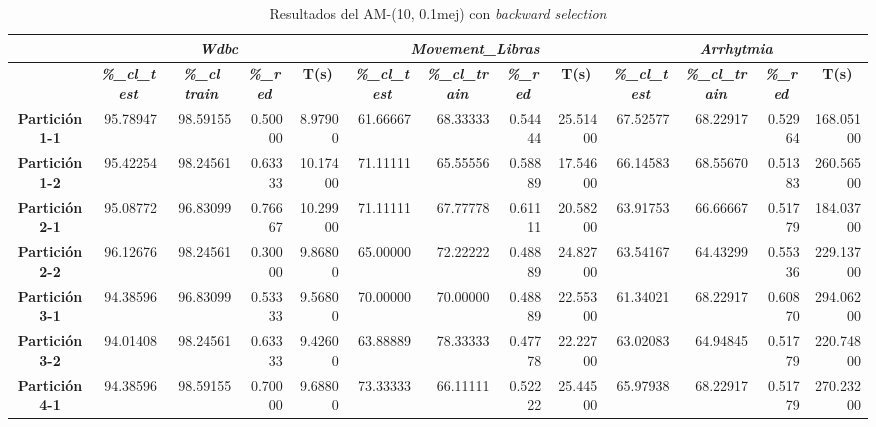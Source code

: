 \documentclass[a4paper,11pt]{article}
\begin{document}
  \begin{table}[H]
  \caption{Resultados del AM-(10, 0.1mej) con \textit{backward selection}}
  \begin{adjustbox}{width=1.1\textwidth}
  \begin{tabular}{|c|r|r|r|r|r|r|r|r|r|r|r|r|}
  \hline
  \multicolumn{1}{|l|}{} & \multicolumn{ 4}{c|}{\textbf{\textit{Wdbc}}} & \multicolumn{ 4}{c|}{\textbf{\textit{Movement\_Libras}}} & \multicolumn{ 4}{c|}{\textbf{\textit{Arrhytmia}}} \\ \hline
  \multicolumn{1}{|l|}{} & \multicolumn{1}{c|}{\textbf{\textit{\%\_cl\_test}}} & \multicolumn{1}{c|}{\textbf{\textit{\%\_cl train}}} & \multicolumn{1}{c|}{\textbf{\textit{\%\_red}}} & \multicolumn{1}{c|}{\textbf{T(s)}} & \multicolumn{1}{c|}{\textbf{\textit{\%\_cl\_test}}} & \multicolumn{1}{c|}{\textbf{\textit{\%\_cl\_train}}} & \multicolumn{1}{c|}{\textbf{\textit{\%\_red}}} & \multicolumn{1}{c|}{\textbf{T(s)}} & \multicolumn{1}{c|}{\textbf{\textit{\%\_cl\_test}}} & \multicolumn{1}{c|}{\textbf{\textit{\%\_cl\_train}}} & \multicolumn{1}{c|}{\textbf{\textit{\%\_red}}} & \multicolumn{1}{c|}{\textbf{T(s)}} \\ \hline
  \textbf{Partición 1-1} & 95.78947 & 98.59155 & 0.50000 & 8.97900 & 61.66667 & 68.33333 & 0.54444 & 25.51400 & 67.52577 & 68.22917 & 0.52964 & 168.05100 \\ \hline
  \textbf{Partición 1-2} & 95.42254 & 98.24561 & 0.63333 & 10.17400 & 71.11111 & 65.55556 & 0.58889 & 17.54600 & 66.14583 & 68.55670 & 0.51383 & 260.56500 \\ \hline
  \textbf{Partición 2-1} & 95.08772 & 96.83099 & 0.76667 & 10.29900 & 71.11111 & 67.77778 & 0.61111 & 20.58200 & 63.91753 & 66.66667 & 0.51779 & 184.03700 \\ \hline
  \textbf{Partición 2-2} & 96.12676 & 98.24561 & 0.30000 & 9.86800 & 65.00000 & 72.22222 & 0.48889 & 24.82700 & 63.54167 & 64.43299 & 0.55336 & 229.13700 \\ \hline
  \textbf{Partición 3-1} & 94.38596 & 96.83099 & 0.53333 & 9.56800 & 70.00000 & 70.00000 & 0.48889 & 22.55300 & 61.34021 & 68.22917 & 0.60870 & 294.06200 \\ \hline
  \textbf{Partición 3-2} & 94.01408 & 98.24561 & 0.63333 & 9.42600 & 63.88889 & 78.33333 & 0.47778 & 22.22700 & 63.02083 & 64.94845 & 0.51779 & 220.74800 \\ \hline
  \textbf{Partición 4-1} & 94.38596 & 98.59155 & 0.70000 & 9.68800 & 73.33333 & 66.11111 & 0.52222 & 25.44500 & 65.97938 & 68.22917 & 0.51779 & 270.23200 \\ \hline

\end{tabular}
\end{adjustbox}
\end{table}
\end{document}
